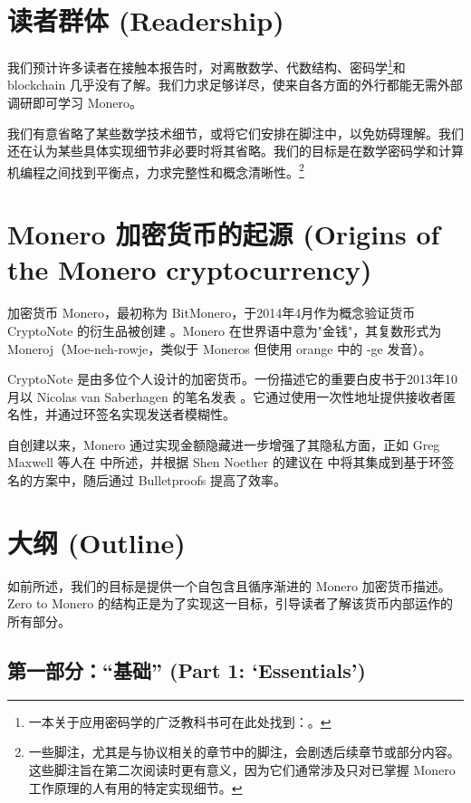 \section{读者群体 (Readership)}

我们预计许多读者在接触本报告时，对离散数学、代数结构、密码学\footnote{一本关于应用密码学的广泛教科书可在此处找到：\cite{applied-cryptography-textbook}。}和 blockchain 几乎没有了解。我们力求足够详尽，使来自各方面的外行都能无需外部调研即可学习 Monero。

我们有意省略了某些数学技术细节，或将它们安排在脚注中，以免妨碍理解。我们还在认为某些具体实现细节非必要时将其省略。我们的目标是在数学密码学和计算机编程之间找到平衡点，力求完整性和概念清晰性。\footnote{一些脚注，尤其是与协议相关的章节中的脚注，会剧透后续章节或部分内容。这些脚注旨在第二次阅读时更有意义，因为它们通常涉及只对已掌握 Monero 工作原理的人有用的特定实现细节。}



\section{Monero 加密货币的起源 (Origins of the Monero cryptocurrency)}

加密货币 Monero，最初称为 BitMonero，于2014年4月作为概念验证货币 CryptoNote 的衍生品被创建 \cite{bitmonero-launched}。Monero 在世界语中意为"金钱"，其复数形式为 Moneroj（Moe-neh-rowje，类似于 Moneros 但使用 orange 中的 -ge 发音）。

CryptoNote 是由多位个人设计的加密货币。一份描述它的重要白皮书于2013年10月以 Nicolas van Saberhagen 的笔名发表 \cite{cryptoNoteWhitePaper}。它通过使用一次性地址提供接收者匿名性，并通过环签名实现发送者模糊性。

自创建以来，Monero 通过实现金额隐藏进一步增强了其隐私方面，正如 Greg Maxwell 等人在 \cite{Signatures2015BorromeanRS} 中所述，并根据 Shen Noether 的建议在 \cite{MRL-0005-ringct} 中将其集成到基于环签名的方案中，随后通过 Bulletproofs \cite{Bulletproofs_paper} 提高了效率。



\section{大纲 (Outline)}

如前所述，我们的目标是提供一个自包含且循序渐进的 Monero 加密货币描述。Zero to Monero 的结构正是为了实现这一目标，引导读者了解该货币内部运作的所有部分。


\subsection{第一部分：``基础'' (Part 1: `Essentials')}

